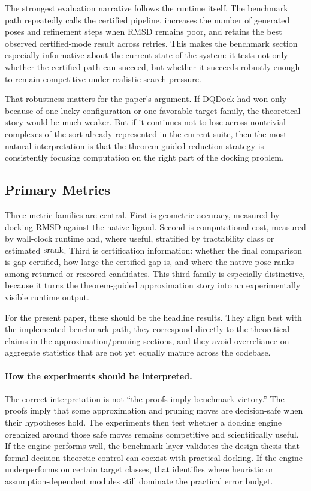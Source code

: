 The strongest evaluation narrative follows the runtime itself. The benchmark path repeatedly calls the certified pipeline, increases the number of generated poses and refinement steps when RMSD remains poor, and retains the best observed certified-mode result across retries. This makes the benchmark section especially informative about the current state of the system: it tests not only whether the certified path can succeed, but whether it succeeds robustly enough to remain competitive under realistic search pressure.

That robustness matters for the paper's argument. If DQDock had won only because of one lucky configuration or one favorable target family, the theoretical story would be much weaker. But if it continues not to lose across nontrivial complexes of the sort already represented in the current suite, then the most natural interpretation is that the theorem-guided reduction strategy is consistently focusing computation on the right part of the docking problem.

\subsection{Primary Metrics}

Three metric families are central. First is geometric accuracy, measured by docking RMSD against the native ligand. Second is computational cost, measured by wall-clock runtime and, where useful, stratified by tractability class or estimated $\operatorname{srank}$. Third is certification information: whether the final comparison is gap-certified, how large the certified gap is, and where the native pose ranks among returned or rescored candidates. This third family is especially distinctive, because it turns the theorem-guided approximation story into an experimentally visible runtime output.

For the present paper, these should be the headline results. They align best with the implemented benchmark path, they correspond directly to the theoretical claims in the approximation/pruning sections, and they avoid overreliance on aggregate statistics that are not yet equally mature across the codebase.

\paragraph{How the experiments should be interpreted.}
The correct interpretation is not ``the proofs imply benchmark victory.'' The proofs imply that some approximation and pruning moves are decision-safe when their hypotheses hold. The experiments then test whether a docking engine organized around those safe moves remains competitive and scientifically useful. If the engine performs well, the benchmark layer validates the design thesis that formal decision-theoretic control can coexist with practical docking. If the engine underperforms on certain target classes, that identifies where heuristic or assumption-dependent modules still dominate the practical error budget.


